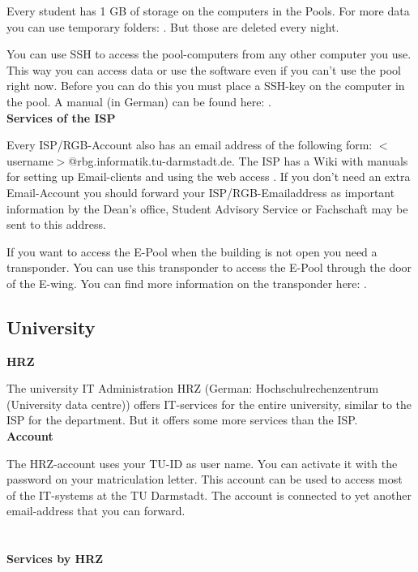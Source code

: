 {Every student has 1 GB of storage on the computers in the Pools. For more data you can use temporary folders: \footnotemark[5]. But those are deleted every night.

You can use SSH \footnotemark[6] to access the pool-computers from any other computer you use. This way you can access data or use the software even if you can't use the pool right now. Before you can do this you must place a SSH-key on the computer in the pool. A manual (in German) can be found here: \footnotemark[6].\\

\noindent\textbf{Services of the ISP}

Every ISP/RGB-Account also has an email address of the following form: $<$username$>$@rbg.informatik.tu-darmstadt.de. The ISP has a Wiki with manuals for setting up Email-clients \footnotemark[7] and using the web access \footnotemark[8]. If you don't need an extra Email-Account you should forward your ISP/RGB-Emailaddress \footnotemark[7] as important information by the Dean's office, Student Advisory Service or Fachschaft may be sent to this address.

If you want to access the E-Pool when the building is not open you need a transponder. You can use this transponder to access the E-Pool through the door of the E-wing. You can find more information on the transponder here: \footnotemark[9].\\


\subsection*{University}

\noindent\textbf{HRZ}

The university IT Administration HRZ (German: Hochschulrechenzentrum (University data centre)) \footnotemark[10] offers IT-services for the entire university, similar to the ISP for the department. But it offers some more services than the ISP.\\

\noindent\textbf{Account}

The HRZ-account uses your TU-ID as user name. You can activate it with the password on your matriculation letter. This account can be used to access most of the IT-systems at the TU Darmstadt. The account is connected to yet another email-address that you can forward. \footnotemark[11]\\
\\\\
\noindent\textbf{Services by HRZ}

}
